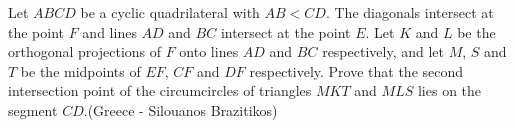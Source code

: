 Let $ABCD$ be a cyclic quadrilateral with $AB<CD$. The diagonals intersect at the point $F$ and lines $AD$ and $BC$ intersect at the point $E$. Let $K$ and $L$ be the orthogonal projections of $F$ onto lines $AD$ and $BC$ respectively, and let $M$,  $S$ and $T$ be the midpoints of $EF$,  $CF$ and $DF$ respectively. Prove that the second intersection point of the circumcircles of triangles $MKT$ and $MLS$ lies on the segment $CD$.(Greece - Silouanos Brazitikos)